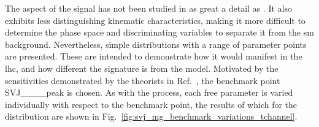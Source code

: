 The \tchannel aspect of the signal has not been studied in as great a detail as \schannel. It also exhibits less distinguishing kinematic characteristics, making it more difficult to determine the phase space and discriminating variables to separate it from the \acrlong{sm} background. Nevertheless, simple distributions with a range of parameter points are presented. These are intended to demonstrate how it would manifest in the \acrshort{lhc}, and how different the signature is from the \schannel model. Motivated by the sensitivities demonstrated by the theorists in Ref.~, the benchmark point SVJ\_\_\_\_\-peak is chosen. As with the \schannel process, each free parameter is varied individually with respect to the benchmark point, the results of which for the \mT distribution are shown in Fig.~\ref{fig:svj_mg_benchmark_variations_tchannel}.

